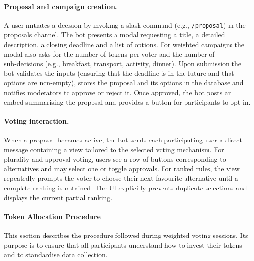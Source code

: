 \paragraph{Proposal and campaign creation.}  A user initiates a decision
by invoking a slash command (e.g., \texttt{/proposal}) in the proposals
channel.  The bot presents a modal requesting a title, a detailed
description, a closing deadline and a list of options.  For weighted
campaigns the modal also asks for the number of tokens per voter and the
number of sub‑decisions (e.g., breakfast, transport, activity, dinner).
Upon submission the bot validates the inputs (ensuring that the deadline
is in the future and that options are non‑empty), stores the proposal
and its options in the database and notifies moderators to approve or
reject it.  Once approved, the bot posts an embed summarising the
proposal and provides a button for participants to opt in.

\paragraph{Voting interaction.}  When a proposal becomes active, the bot
sends each participating user a direct message containing a view tailored
to the selected voting mechanism.  For plurality and approval voting,
users see a row of buttons corresponding to alternatives and may select
one or toggle approvals.  For ranked rules, the view repeatedly
prompts the voter to choose their next favourite alternative until a
complete ranking is obtained.  The UI explicitly prevents
duplicate selections and displays the current partial ranking.

\paragraph{Token Allocation Procedure}
\label{sec:token-allocation}

This section describes the procedure followed during weighted voting
sessions.  Its purpose is to ensure that all participants understand
how to invest their tokens and to standardise data collection.

